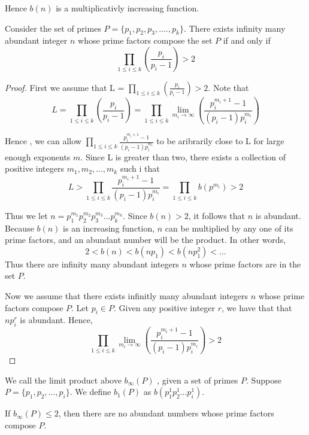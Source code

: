 \documentclass[../paper.tex]{article}
\begin{document}
Hence $b(n)$ is a multiplicativly increasing function.

\begin{theorem}\label{b_inf_1}
Consider the set of primes 
%
$P = \{p_{1}, p_{2}, p_{3}, .... , p_{k}\}$.
%
There exists infinity many abundant integer $n$ whose prime 
factors compose the set $P$  if and only if
%
$$\prod_{1 \leq i \leq k} (\frac{p_{i}}{p_{i} -1}) > 2$$
%
\end{theorem}

\begin{proof}

First we assume that  
%
L = $\prod_{1 \leq i \leq k} (\frac{p_{i}}{p_{i} -1}) > 2$.
%
Note that
%  
$$L = \prod_{1 \leq i \leq k} (\frac{p_{i}}{p_{i} -1}) 
%
= \prod_{1 \leq i \leq k} \lim_{m_i \rightarrow \infty} 
%
( \frac{p_i^{m_{i} + 1} -1}{(p_i -1)p_{i}^{m_{i}}})$$

Hence , we can allow
$\prod_{1 \leq i \leq k} \frac{p_i^{m_{i} + 1} -1}
{(p_i -1)p_{i}^{m_{i}}}$ to be aribrarily close to L for large enough  
exponents $m$. Since L is greater than two, there exists a
collection of positive integers $m_1, m_2, ... , m_k$ such i
that 
% 
$$L > \prod_{1 \leq i \leq k} \frac{p_i^{m_{i} + 1} -1}
{(p_i -1)p_{i}^{m_{i}}} = \prod_{1 \leq i \leq k} b(p^{m_i}) > 2$$
%

Thus we let $n=p_1^{m_1}p_2^{m_2}p_3^{m_3}...p_{k}^{m_k}$. 
Since $b(n) > 2$, it follows that $n$ is abundant. 
Because $b(n)$ is an increasing function, $n$ can be multiplied
by any one of its prime factors, and an abundant number 
will be the product. In other words,
%
$$2 < b(n) < b(np_1) < b(np_1^2) < ...$$
%
Thus there are infinity many abundant integers $n$ whose prime
factors are in the set $P$.

Now we assume that there exists infinitly many abundant integers 
$n$ whose prime factors compose $P$. Let $p_i \in P$. Given any
positive integer $r$, we have that that $np_i^r$ is abundant. 
Hence,
%
$$\prod_{1 \leq i \leq k} \lim_{m_i \rightarrow \infty} 
( \frac{p_i^{m_{i} + 1} -1}{(p_i -1)p_{i}^{m_{i}}}) > 2$$

\end{proof}

We call the limit product above $b_{\infty}(P)$ , given a set of primes
$P$. Suppose $P = \{p_1, p_2, ..., p_i \}$. We define $b_1(P)$ as
$b(p_1^1 p_2^1 ... p_i^1)$.

\begin{theorem}
If $b_{\infty}(P) \leq 2$, then there are no abundant numbers 
whose prime factors compose $P$.
\end{theorem}
\end{document}
